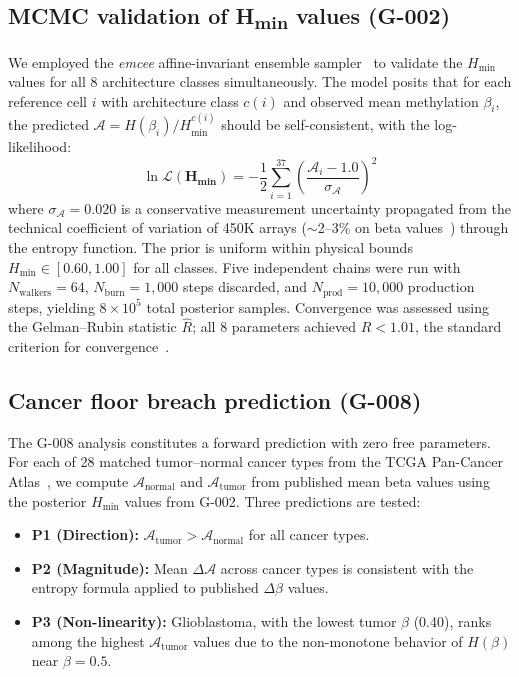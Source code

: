 \documentclass[12pt,a4paper]{article}
\newcommand{\Hmin}{H_{\min}}
\newcommand{\Ascore}{\mathcal{A}}
\begin{document}
\subsection{MCMC validation of H\textsubscript{min} values (G-002)}
\label{sec:g002methods}

We employed the \textit{emcee} affine-invariant ensemble
sampler~\cite{ForemanMackey2013} to validate the $\Hmin$ values for all
8 architecture classes simultaneously. The model posits that for each
reference cell $i$ with architecture class $c(i)$ and observed mean
methylation $\beta_i$, the predicted $\Ascore = H(\beta_i)/\Hmin^{c(i)}$
should be self-consistent, with the log-likelihood:
\begin{equation}
  \ln\mathcal{L}(\boldsymbol{\Hmin}) = -\frac{1}{2}\sum_{i=1}^{37}
  \left(\frac{\Ascore_i - 1.0}{\sigma_{\Ascore}}\right)^2
  \label{eq:lhood_g002}
\end{equation}
where $\sigma_{\Ascore} = 0.020$ is a conservative measurement uncertainty
propagated from the technical coefficient of variation of 450K arrays
($\sim$2--3\% on beta values~\cite{Bibikova2011}) through the entropy function.
The prior is uniform within physical bounds $\Hmin \in [0.60, 1.00]$ for
all classes. Five independent chains were run with $N_{\mathrm{walkers}} = 64$,
$N_{\mathrm{burn}} = 1{,}000$ steps discarded, and $N_{\mathrm{prod}} = 10{,}000$
production steps, yielding $8 \times 10^5$ total posterior samples.
Convergence was assessed using the Gelman--Rubin statistic $\hat{R}$; all
8 parameters achieved $\hat{R} < 1.01$, the standard criterion for
convergence~\cite{GelmanRubin1992}.

\subsection{Cancer floor breach prediction (G-008)}
\label{sec:g008methods}

The G-008 analysis constitutes a forward prediction with zero free parameters.
For each of 28 matched tumor--normal cancer types from the TCGA Pan-Cancer
Atlas~\cite{Weinstein2013}, we compute $\Ascore_{\mathrm{normal}}$ and
$\Ascore_{\mathrm{tumor}}$ from published mean beta values using the posterior
$\Hmin$ values from G-002. Three predictions are tested:
\begin{itemize}[leftmargin=2em,itemsep=2pt]
  \item \textbf{P1 (Direction):} $\Ascore_{\mathrm{tumor}} > \Ascore_{\mathrm{normal}}$ for all cancer types.
  \item \textbf{P2 (Magnitude):} Mean $\Delta\Ascore$ across cancer types is consistent with the entropy formula applied to published $\Delta\beta$ values.
  \item \textbf{P3 (Non-linearity):} Glioblastoma, with the lowest tumor $\beta$ (0.40), ranks among the highest $\Ascore_{\mathrm{tumor}}$ values due to the non-monotone behavior of $H(\beta)$ near $\beta = 0.5$.
\end{itemize}
\end{document}
